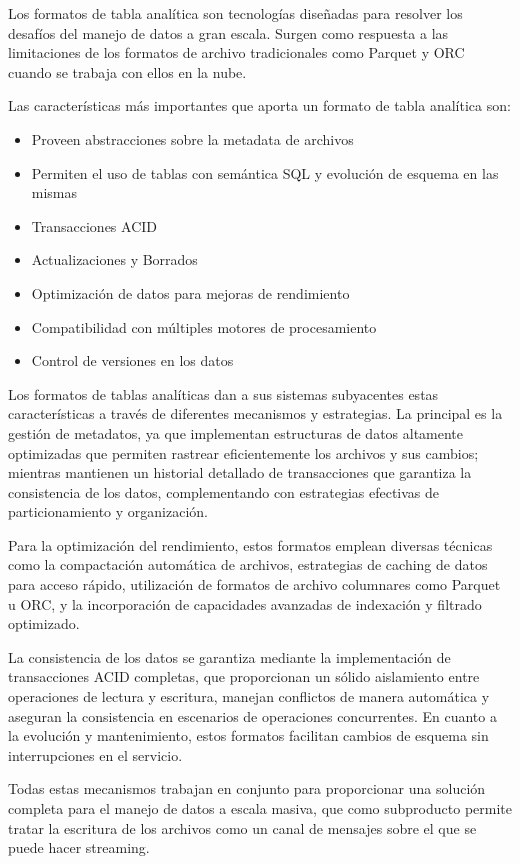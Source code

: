 Los formatos de tabla analítica son tecnologías diseñadas para resolver los desafíos del manejo de datos
a gran escala. Surgen como respuesta a las limitaciones de los formatos de archivo tradicionales como Parquet y ORC
cuando se trabaja con ellos en la nube. 

Las características más importantes que aporta un formato de tabla analítica son:

\begin{itemize}
    \item Proveen abstracciones sobre la metadata de archivos
    \item Permiten el uso de tablas con semántica SQL y evolución de esquema en las mismas
    \item Transacciones ACID
    \item Actualizaciones y Borrados
    \item Optimización de datos para mejoras de rendimiento
    \item Compatibilidad con múltiples motores de procesamiento
    \item Control de versiones en los datos
\end{itemize}

Los formatos de tablas analíticas dan a sus sistemas subyacentes estas características a través de diferentes mecanismos y estrategias. 
La principal es la gestión de metadatos, ya que implementan estructuras de datos altamente optimizadas que permiten rastrear 
eficientemente los archivos y sus cambios; mientras mantienen un historial detallado de transacciones que garantiza la consistencia de los datos, 
complementando con estrategias efectivas de particionamiento y organización. 

Para la optimización del rendimiento, estos formatos emplean diversas técnicas como la compactación automática de archivos, 
estrategias de caching de datos para acceso rápido, utilización de formatos de archivo columnares como Parquet u ORC, 
y la incorporación de capacidades avanzadas de indexación y filtrado optimizado. 

La consistencia de los datos se garantiza mediante la implementación de transacciones ACID completas, 
que proporcionan un sólido aislamiento entre operaciones de lectura y escritura, manejan conflictos de manera automática 
y aseguran la consistencia en escenarios de operaciones concurrentes. 
En cuanto a la evolución y mantenimiento, estos formatos facilitan cambios de esquema sin interrupciones en el servicio. 

Todas estas mecanismos trabajan en conjunto para proporcionar una solución completa para el manejo de datos a escala masiva,
que como subproducto permite tratar la escritura de los archivos como un canal de mensajes sobre el que se puede hacer streaming.

